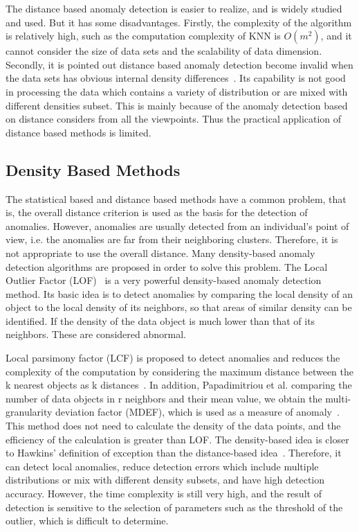 The distance based anomaly detection
is easier to realize,
and is widely studied and used.
But it has some disadvantages.
Firstly,
the complexity of the algorithm is relatively high,
such as the computation complexity of KNN is $O(m^2)$,
and it cannot consider the size of
data sets and the scalability of data dimension.
Secondly,
it is pointed out distance based anomaly detection become invalid when
the data sets has obvious internal density
differences~\cite{breunig2000lof}.
Its capability is not good in processing the data which
contains a variety of distribution or
are mixed with different densities subset.
This is mainly because of the anomaly detection based on
distance considers from all the viewpoints.
Thus the practical application  of distance based methods is limited.

\subsection{Density Based Methods}

The statistical based and distance based methods have a common problem,
that is,
the overall distance criterion is used as the basis for the detection of anomalies.
However,
anomalies are usually detected from an individual's point of view,
i.e.
the anomalies are far from their neighboring clusters.
Therefore,
it is not appropriate to use the overall distance.
Many density-based anomaly detection algorithms are proposed
in order to solve this problem.
The Local Outlier Factor (LOF)~\cite{breunig2000lof}
is a very powerful density-based anomaly detection method.
Its basic idea is to detect anomalies by comparing the local density of an object to the local density of its neighbors,
so that areas of similar density can be identified.
If the density of the data object is
much lower than that of its neighbors.
These are considered abnormal.

Local parsimony factor (LCF) is proposed to
detect anomalies and reduces the complexity of the
computation by considering the maximum distance between
the k nearest objects as k distances~\cite{agyemang2004algorithm}.
In addition,
Papadimitriou et al. comparing the number of data objects in r neighbors and their mean value,
we obtain the multi-granularity deviation factor (MDEF),
which is used as a measure of anomaly~\cite{papadimitriou2003loci}.
This method does not need to calculate the density of the data points,
and the efficiency of the calculation is greater than LOF.
The density-based idea is closer to Hawkins' definition of
exception than the distance-based idea~\cite{hawkins1980identification}.
Therefore,
it can detect local anomalies,
reduce detection errors which include multiple
distributions or mix with different density subsets,
and have high detection accuracy.
However,
the time complexity is still very high,
and the result of detection  is sensitive to
the selection of parameters such as the threshold of the outlier,
which is difficult to determine.

